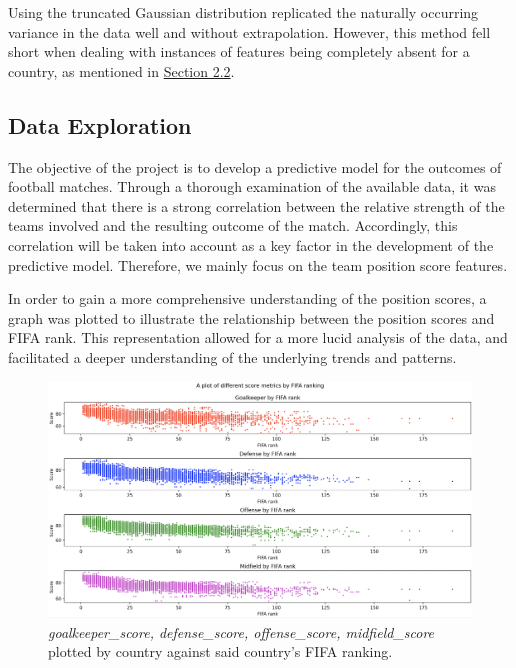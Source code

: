 Using the truncated Gaussian distribution replicated the naturally occurring variance in the data well and without extrapolation. However, this method fell short when dealing with instances of features being completely absent for a country, as mentioned in \hyperref[sec:miss data]{Section 2.2}.

\subsection{Data Exploration}
The objective of the project is to develop a predictive model for the outcomes of football matches. Through a thorough examination of the available data, it was determined that there is a strong correlation between the relative strength of the teams involved and the resulting outcome of the match. Accordingly, this correlation will be taken into account as a key factor in the development of the predictive model. 
Therefore, we mainly focus on the team position score features.

In order to gain a more comprehensive understanding of the position scores, a graph was plotted to illustrate the relationship between the position scores and FIFA rank. This representation allowed for a more lucid analysis of the data, and facilitated a deeper understanding of the underlying trends and patterns.
\begin{figure}[H]
    \centering
    \includegraphics[scale=.3]{scores_plots.png}
    \caption{\textit{goalkeeper\_score, defense\_score, offense\_score, midfield\_score} plotted by country against said country's FIFA ranking.}
    \label{fig:scoreplots}
\end{figure}